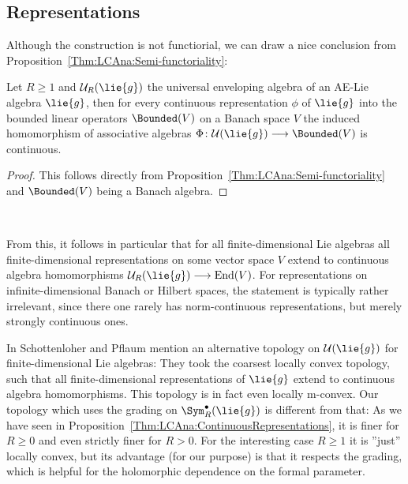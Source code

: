 \subsection{Representations}

Although the construction is not functiorial, we can draw a nice conclusion 
from Proposition~\ref{Thm:LCAna:Semi-functoriality}:
\begin{proposition}
    \label{Thm:LCAna:ContinuousRepresentations}%
    Let $R \geq 1$ and $\mathcal{U}_R(\lie{g})$ the universal
    enveloping algebra of an AE-Lie algebra $\lie{g}$, then for every
    continuous representation $\phi$ of $\lie{g}$ into the bounded
    linear operators $\Bounded(V)$ on a Banach space $V$ the induced
    homomorphism of associative algebras $\Phi \colon
    \mathcal{U}(\lie{g}) \longrightarrow \Bounded(V)$ is continuous.
\end{proposition}
\begin{proof}
    This follows directly from
    Proposition~\ref{Thm:LCAna:Semi-functoriality} and $\Bounded(V)$
    being a Banach algebra.
\end{proof}
\begin{remark}
    \label{Rem:LCAnaBCHConvergence}
    ~
    \begin{remarklist}
    \item \label{item:FiniteDimRepsContinuous} From this, it follows
        in particular that for all finite-dimensional Lie algebras all
        finite-dimensional representations on some vector space $V$
        extend to continuous algebra homomorphisms
        $\mathcal{U}_R(\lie{g}) \longrightarrow
        \operatorname{End}(V)$. For representations on
        infinite-dimensional Banach or Hilbert spaces, the statement
        is typically rather irrelevant, since there one rarely has
        norm-continuous representations, but merely strongly
        continuous ones.
    \item In \cite{pflaum.schottenloher:1998a} Schottenloher and
        Pflaum mention an alternative topology on
        $\mathcal{U}(\lie{g})$ for finite-dimensional Lie algebras:
        They took the coarsest locally convex topology, such that all
        finite-dimensional representations of $\lie{g}$ extend to
        continuous algebra homomorphisms. This topology is in fact
        even locally m-convex. Our topology which uses the grading on
        $\Sym_R^{\bullet}(\lie{g})$ is different from that: As we have
        seen in Proposition~\ref{Thm:LCAna:ContinuousRepresentations},
        it is finer for $R \geq 0$ and even strictly finer for $R >
        0$. For the interesting case $R \geq 1$ it is ''just'' locally
        convex, but its advantage (for our purpose) is that it
        respects the grading, which is helpful for the holomorphic
        dependence on the formal parameter. 
    \end{remarklist}
\end{remark}
